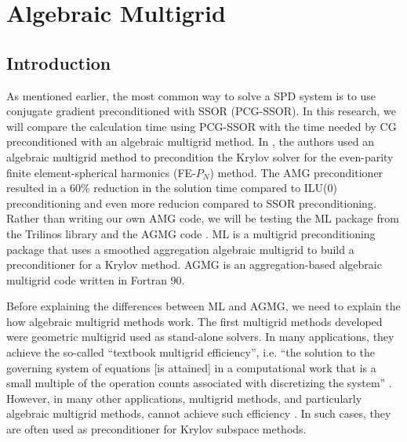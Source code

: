 \section{Algebraic Multigrid} \label{sec_amg}
\subsection{Introduction}
As mentioned earlier, the most common way to solve a SPD system is to use
conjugate gradient preconditioned with SSOR (PCG-SSOR). In this research, we
will compare the calculation time using PCG-SSOR with the time needed by CG 
preconditioned with an algebraic multigrid method. In \cite{amg_pn}, the authors 
used an algebraic multigrid method to precondition the Krylov solver for the 
even-parity finite element-spherical harmonics (FE-$P_N$) method. The AMG 
preconditioner resulted in a 60\% reduction in the solution time compared to 
ILU(0) preconditioning and even more reducion compared to SSOR preconditioning. 
Rather than writing our own AMG code, we will be testing the ML package 
\cite{ml_guide} from the Trilinos library and the AGMG code \cite{agmg_guide}. 
ML is a multigrid preconditioning package that uses a smoothed aggregation 
algebraic multigrid to build a preconditioner for a Krylov method. AGMG is an 
aggregation-based algebraic multigrid code written in Fortran 90.

Before explaining the differences between ML and AGMG, we need to explain the
how algebraic multigrid methods work. The first multigrid methods
developed were geometric multigrid used as stand-alone solvers. In many 
applications, they achieve the so-called ``textbook multigrid
efficiency'', i.e. ``the solution to the governing system of equations [is
attained] in a computational work that is a small multiple of the operation
counts associated with discretizing the system'' \cite{textbook_eff}. However, 
in many other applications, multigrid methods, and particularly algebraic 
multigrid methods, cannot achieve such efficiency \cite{k_cycle}. In
such cases, they are often used as preconditioner for Krylov subspace methods. 

